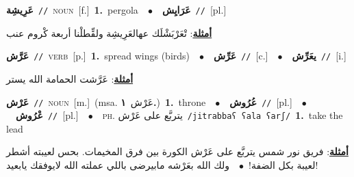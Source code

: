 \documentclass[10pt,a4paper,twoside]{article} %
\begin{document}
\begin{multicols}{2}
{\setlength\topsep{0pt}\textbf{\foreignlanguage{arabic}{عَرِيشِة}}\ {\color{gray}\texttt{//}\color{black}}\ \textsc{noun}\ [f.]\ \textbf{1.}~pergola\ \ $\bullet$\ \ \setlength\topsep{0pt}\textbf{\foreignlanguage{arabic}{عَرَايِش}}\ {\color{gray}\texttt{//}\color{black}}\ [pl.]\  \begin{flushright}\color{gray}\foreignlanguage{arabic}{\textbf{\underline{\foreignlanguage{arabic}{أمثلة}}}: تْعَرْبَشْلَك عهالعَرِيشِة ولقِّطلْنا أربعة كْروم عنب}\end{flushright}\color{black}} \vspace{2mm}

{\setlength\topsep{0pt}\textbf{\foreignlanguage{arabic}{عَرَّش}}\ {\color{gray}\texttt{//}\color{black}}\ \textsc{verb}\ [p.]\ \textbf{1.}~spread wings (birds)\ \ $\bullet$\ \ \setlength\topsep{0pt}\textbf{\foreignlanguage{arabic}{عَرِّش}}\ {\color{gray}\texttt{//}\color{black}}\ [c.]\ \ $\bullet$\ \ \setlength\topsep{0pt}\textbf{\foreignlanguage{arabic}{يعَرِّش}}\ {\color{gray}\texttt{//}\color{black}}\ [i.]\  \begin{flushright}\color{gray}\foreignlanguage{arabic}{\textbf{\underline{\foreignlanguage{arabic}{أمثلة}}}: عَرَّشت الحمامة الله يستر}\end{flushright}\color{black}} \vspace{2mm}

{\setlength\topsep{0pt}\textbf{\foreignlanguage{arabic}{عَرْش}}\ {\color{gray}\texttt{//}\color{black}}\ \textsc{noun}\ [m.]\ \color{gray}(msa. \foreignlanguage{arabic}{عَرْش}~\foreignlanguage{arabic}{\textbf{١.}})\color{black}\ \textbf{1.}~throne\ \ $\bullet$\ \ \setlength\topsep{0pt}\textbf{\foreignlanguage{arabic}{عُرُوش}}\ {\color{gray}\texttt{//}\color{black}}\ [pl.]\ \ $\bullet$\ \ \setlength\topsep{0pt}\textbf{\foreignlanguage{arabic}{عْرُوش}}\ {\color{gray}\texttt{//}\color{black}}\ [pl.]\ \ $\bullet$\ \ \textsc{ph.} \color{gray} \foreignlanguage{arabic}{يتربَّع على عَرْش}\color{black}\ {\color{gray}\texttt{/{\sffamily jitrabbaʕ ʕala ʕarʃ}/}\color{black}}\ \textbf{1.}~take the lead\  \begin{flushright}\color{gray}\foreignlanguage{arabic}{\textbf{\underline{\foreignlanguage{arabic}{أمثلة}}}: فريق نور شمس يتربَّع على عَرْش الكورة بين فرق المخيمات. بحس لعيبته أشطر لعيبة بكل الضفة!\ $\bullet$\ \  ولك الله بعَرْشه مابيرضى باللي عملته الله لايوفقك يابعيد!}\end{flushright}\color{black}} \vspace{2mm}


\end{multicols}
\end{document}
